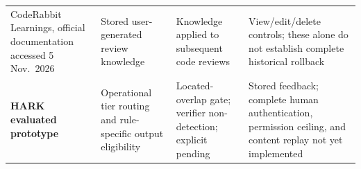 \begin{table}[!ht]
\begin{tabularx}{\textwidth}{@{}>{\raggedright\arraybackslash}p{2.6cm}>{\raggedright\arraybackslash}X>{\raggedright\arraybackslash}X>{\raggedright\arraybackslash}X@{}}
CodeRabbit Learnings, official documentation accessed 5 Nov.\ 2026~\cite{coderabbitLearnings} & Stored user-generated review knowledge & Knowledge applied to subsequent code reviews & View/edit/delete controls; these alone do not establish complete historical rollback \\
\textbf{HARK evaluated prototype} & Operational tier routing and rule-specific output eligibility & Located-overlap gate; verifier non-detection; explicit pending & Stored feedback; complete human authentication, permission ceiling, and content replay not yet implemented \\
\bottomrule
\end{tabularx}
\end{table}



